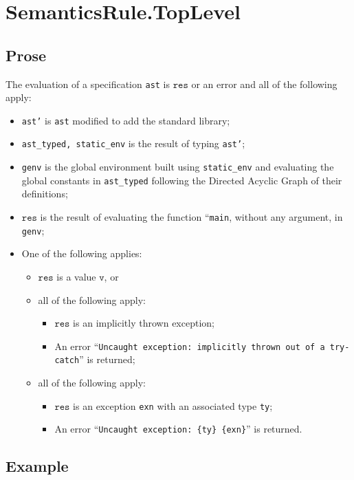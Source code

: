 \documentclass{book}
\newcommand\vv[0]{\texttt{v}}
\newcommand\vres[0]{\texttt{res}}
\begin{document}
  \section{SemanticsRule.TopLevel \label{sec:SemanticsRule.TopLevel}}

  \subsection{Prose}
  The evaluation of a specification \texttt{ast} is $\vres$ or an error
  and all of the following apply:
  \begin{itemize}
  \item \texttt{ast’} is \texttt{ast} modified to add the standard library;
  \item \texttt{ast\_typed, static\_env} is the result of typing \texttt{ast’};
  \item \texttt{genv} is the global environment built using \texttt{static\_env} and evaluating the global constants in \texttt{ast\_typed} following the Directed Acyclic Graph of their definitions;
  \item $\vres$ is the result of evaluating the function ``\texttt{main}, without any argument, in \texttt{genv};
  \item One of the following applies:
        \begin{itemize}
	\item $\vres$ is a value $\vv$, or
	\item all of the following apply:
              \begin{itemize}
              \item $\vres$ is an implicitly thrown exception;
	      \item An error ``\texttt{Uncaught exception: implicitly thrown out of a try-catch}'' is returned;
              \end{itemize}
	\item all of the following apply:
              \begin{itemize}
              \item $\vres$ is an exception \texttt{exn} with an associated type \texttt{ty};
	      \item An error ``\texttt{Uncaught exception: \{ty\} \{exn\}}'' is returned.
              \end{itemize}
        \end{itemize}
  \end{itemize}

  \subsection{Example}
\end{document}
